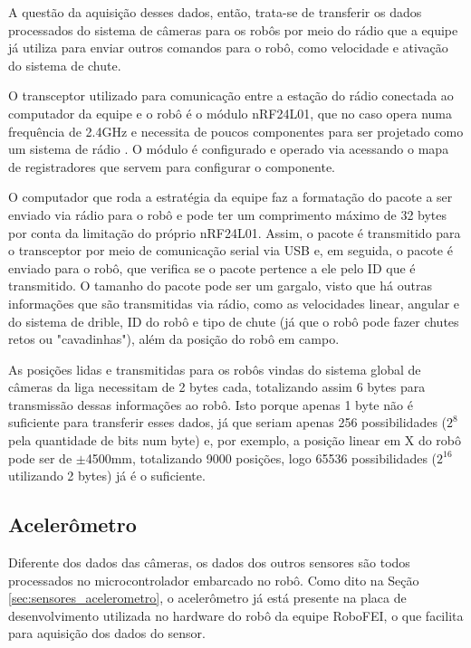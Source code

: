 \documentclass[acronym, symbols, table]{fei}
\begin{document}
				A questão da aquisição desses dados, então, trata-se de transferir os dados processados do sistema de câmeras para os robôs por meio do rádio que a equipe já utiliza para enviar outros comandos para o robô, como velocidade e ativação do sistema de chute.
				
				O transceptor utilizado para comunicação entre a estação do rádio conectada ao computador da equipe e o robô é o módulo nRF24L01, que no caso opera numa frequência de 2.4GHz e necessita de poucos componentes para ser projetado como um sistema de rádio \cite{datasheet_nrf24}. O módulo é configurado e operado via  acessando o mapa de registradores que servem para configurar o componente.
				
				O computador que roda a estratégia da equipe faz a formatação do pacote a ser enviado via rádio para o robô e pode ter um comprimento máximo de 32 bytes por conta da limitação do próprio nRF24L01. Assim, o pacote é transmitido para o transceptor por meio de comunicação serial via USB e, em seguida, o pacote é enviado para o robô, que verifica se o pacote pertence a ele pelo ID que é transmitido. O tamanho do pacote pode ser um gargalo, visto que há outras informações que são transmitidas via rádio, como as velocidades linear, angular e do sistema de drible, ID do robô e tipo de chute (já que o robô pode fazer chutes retos ou "cavadinhas"), além da posição do robô em campo.
				
				As posições lidas e transmitidas para os robôs vindas do sistema global de câmeras da liga necessitam de 2 bytes cada, totalizando assim 6 bytes para transmissão dessas informações ao robô. Isto porque apenas 1 byte não é suficiente para transferir esses dados, já que seriam apenas 256 possibilidades ($2^8$ pela quantidade de bits num byte) e, por exemplo, a posição linear em X do robô pode ser de $\pm$4500mm, totalizando 9000 posições, logo 65536 possibilidades ($2^{16}$ utilizando 2 bytes) já é o suficiente.
				
			\subsection{Acelerômetro}
			
				Diferente dos dados das câmeras, os dados dos outros sensores são todos processados no microcontrolador embarcado no robô. Como dito na Seção \ref{sec:sensores_acelerometro}, o acelerômetro já está presente na placa de desenvolvimento utilizada no hardware do robô da equipe RoboFEI, o que facilita para aquisição dos dados do sensor.
				
\end{document}
